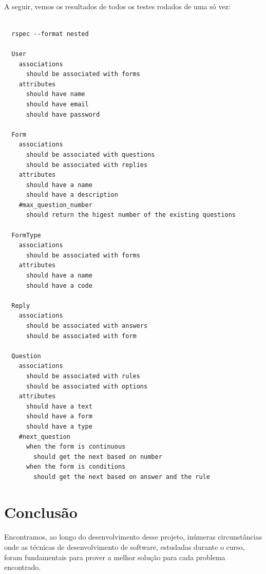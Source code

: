\documentclass[11pt]{article}
\begin{document}
    \paragraph{}
    
    A seguir, vemos os resultados de todos os testes rodados de uma
    só vez:
    
    {\scriptsize
      \lstset{language=Bash}
      \begin{lstlisting}

  rspec --format nested 
  
  User
    associations
      should be associated with forms
    attributes
      should have name
      should have email
      should have password

  Form
    associations
      should be associated with questions
      should be associated with replies
    attributes
      should have a name
      should have a description
    #max_question_number
      should return the higest number of the existing questions

  FormType
    associations
      should be associated with forms
    attributes
      should have a name
      should have a code

  Reply
    associations
      should be associated with answers
      should be associated with form
    
  Question
    associations
      should be associated with rules
      should be associated with options
    attributes
      should have a text
      should have a form
      should have a type
    #next_question
      when the form is continuous
        should get the next based on number
      when the form is conditions
        should get the next based on answer and the rule
      \end{lstlisting}
    }
    
    
  \clearpage
      
  \section{Conclusão}

    \paragraph{}
    Encontramos, ao longo do desenvolvimento desse projeto, inúmeras 
    circunstâncias onde as técnicas de desenvolvimento de software, 
    estudadas durante o curso, foram fundamentais para prover a melhor 
    solução para cada problema encontrado.
    
\end{document}

